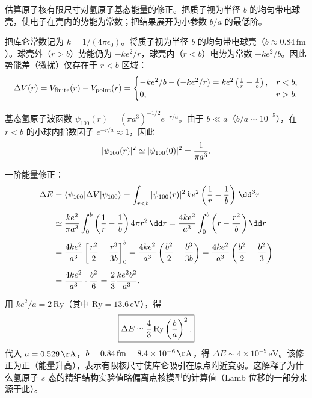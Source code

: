 \begin{question}
估算原子核有限尺寸对氢原子基态能量的修正。把质子视为半径 $b$ 的均匀带电球壳，使电子在壳内的势能为常数；把结果展开为小参数 $b/a$ 的最低阶。
\end{question}
\begin{solution}
把库仑常数记为 $k=1/(4\pi\epsilon_0)$。将质子视为半径 $b$ 的均匀带电球壳（$b\approx0.84\,\mathrm{fm}$）。球壳外（$r>b$）势能仍为 $-ke^2/r$，球壳内（$r<b$）电势为常数 $-ke^2/b$。因此势能差（微扰）仅存在于 $r<b$ 区域：
\[
\Delta V(r)=V_{\rm finite}(r)-V_{\rm point}(r)=\begin{cases}
-ke^2/b - (-ke^2/r) = ke^2\left({1\over r}-{1\over b}\right), & r<b,\\
0, & r>b.
\end{cases}
\]

基态氢原子波函数 $\psi_{100}(r)=(\pi a^3)^{-1/2}e^{-r/a}$。由于 $b\ll a$（$b/a\sim10^{-5}$），在 $r<b$ 的小球内指数因子 $e^{-r/a}\approx 1$，因此
\[
|\psi_{100}(r)|^2 \simeq |\psi_{100}(0)|^2 = {1\over\pi a^3}.
\]

一阶能量修正：
\[
\begin{aligned}
\Delta E &= \langle\psi_{100}|\Delta V|\psi_{100}\rangle
= \int_{r<b} |\psi_{100}(r)|^2\,ke^2\left({1\over r}-{1\over b}\right)\,\dd^3r \\[4pt]
&\simeq {ke^2\over\pi a^3}\int_0^b\left({1\over r}-{1\over b}\right)4\pi r^2\,\dd r
= {4ke^2\over a^3}\int_0^b\left(r-{r^2\over b}\right)\dd r \\[4pt]
&= {4ke^2\over a^3}\left[{r^2\over2}-{r^3\over3b}\right]_0^b
= {4ke^2\over a^3}\left({b^2\over2}-{b^3\over3b}\right)
= {4ke^2\over a^3}\left({b^2\over2}-{b^2\over3}\right) \\[4pt]
&= {4ke^2\over a^3}\cdot{b^2\over6}
= {2\over3}{ke^2 b^2\over a^3}.
\end{aligned}
\]

用 $ke^2/a = 2\,\mathrm{Ry}$（其中 $\mathrm{Ry}=13.6\,\mathrm{eV}$），得
\[
\boxed{\Delta E \simeq {4\over3}\,\mathrm{Ry}\left({b\over a}\right)^2.}
\]
代入 $a=0.529\,\mathrm{\AA}$，$b=0.84\,\mathrm{fm}=8.4\times10^{-6}\,\mathrm{\AA}$，得 $\Delta E\sim 4\times10^{-9}\,\mathrm{eV}$。该修正为正（能量升高），表示有限核尺寸使库仑吸引在原点附近变弱。这解释了为什么氢原子 $s$ 态的精细结构实验值略偏离点核模型的计算值（Lamb 位移的一部分来源于此）。
\end{solution}

